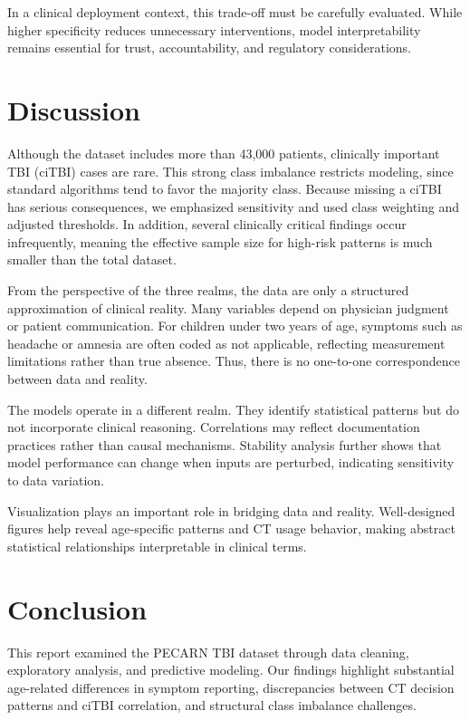 \documentclass[11pt,letterpaper]{article}
\begin{document}
In a clinical deployment context, this trade-off must be carefully evaluated. While higher specificity reduces unnecessary interventions, model interpretability remains essential for trust, accountability, and regulatory considerations.


\section{Discussion}\label{discussion}

Although the dataset includes more than 43,000 patients, clinically important TBI (ciTBI) cases are rare. This strong class imbalance restricts modeling, since standard algorithms tend to favor the majority class. Because missing a ciTBI has serious consequences, we emphasized sensitivity and used class weighting and adjusted thresholds. In addition, several clinically critical findings occur infrequently, meaning the effective sample size for high-risk patterns is much smaller than the total dataset.

From the perspective of the three realms, the data are only a structured approximation of clinical reality. Many variables depend on physician judgment or patient communication. For children under two years of age, symptoms such as headache or amnesia are often coded as not applicable, reflecting measurement limitations rather than true absence. Thus, there is no one-to-one correspondence between data and reality.

The models operate in a different realm. They identify statistical patterns but do not incorporate clinical reasoning. Correlations may reflect documentation practices rather than causal mechanisms. Stability analysis further shows that model performance can change when inputs are perturbed, indicating sensitivity to data variation.

Visualization plays an important role in bridging data and reality. Well-designed figures help reveal age-specific patterns and CT usage behavior, making abstract statistical relationships interpretable in clinical terms.


\section{Conclusion}\label{conclusion}

This report examined the PECARN TBI dataset through data cleaning, exploratory analysis, and predictive modeling. Our findings highlight substantial age-related differences in symptom reporting, discrepancies between CT decision patterns and ciTBI correlation, and structural class imbalance challenges.
\end{document}
